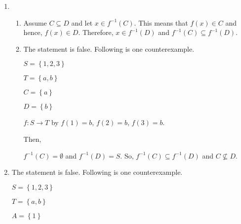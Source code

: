 \begin{enumerate}
\begin{enumerate}
\item The statement is false.  Following is one counterexample.
\begin{multicols}{4}
$S = \left\{ 1, 2, 3 \right\}$

$T = \left\{ a, b \right\}$

$A = \left\{ 1 \right\}$

$B = \left\{ 2, 3 \right\}$
\end{multicols}
$f: S \to T$ by $f \left( 1 \right) = a$, $f \left( 2 \right) = a$, $f \left( 3 \right) = b$.

Then,

$f \left( A \right) = \left\{a \right\}$ and $f \left( B \right) = \left\{ a, b \right\}$.  So, 
$f \left( A \right) \subseteq f \left( B \right)$ and $A \not \subseteq B$.
\end{enumerate}

\item \begin{enumerate}
\item Assume $C \subseteq D$ and let $x \in f^{-1} \left( C \right)$.  This means that 
$f \left( x \right) \in C$ and hence, $f \left( x \right) \in D$.  Therefore,  
$x \in f^{-1} \left( D \right)$ and $f^{-1} \left( C \right) \subseteq f^{-1} \left( D \right)$.

\item The statement is false.  Following is one counterexample.
\begin{multicols}{4}
$S = \left\{ 1, 2, 3 \right\}$

$T = \left\{ a, b \right\}$

$C = \left\{ a \right\}$

$D = \left\{ b \right\}$
\end{multicols}
$f: S \to T$ by $f \left( 1 \right) = b$, $f \left( 2 \right) = b$, $f \left( 3 \right) = b$.

Then,

$f^{-1} \left( C \right) = \emptyset$ and $f^{-1} \left( D \right) = S$.  So, 
$f^{-1} \left( C \right) \subseteq f^{-1} \left( D \right)$ and $C \not \subseteq D$.
\end{enumerate}

\item The statement is false.  Following is one counterexample.
\begin{multicols}{4}
$S = \left\{ 1, 2, 3 \right\}$

$T = \left\{ a, b \right\}$

$A = \left\{ 1 \right\}$


\end{multicols}
\end{enumerate}
